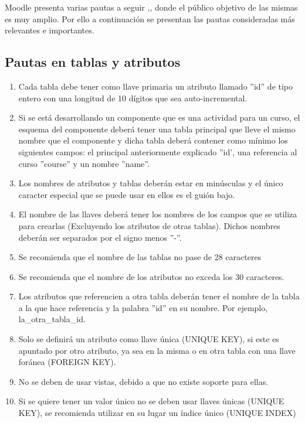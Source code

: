     \noindent Moodle presenta varias pautas a seguir \cite{moodlePautasBD1},\cite{ moodlePautasBD2}, donde el público objetivo de las mismas es muy amplio. Por ello a continuación se presentan las pautas consideradas más relevantes e importantes.
    
\subsection{Pautas en tablas y atributos}
    \begin{enumerate}
        \item Cada tabla debe tener como llave primaria un atributo llamado ''id'' de tipo entero con una longitud de 10 dígitos que sea auto-incremental. 
        \item Si se está desarrollando un componente que es una actividad para un curso, el esquema del componente deberá tener una tabla principal que lleve el mismo nombre que el componente y dicha tabla deberá contener como mínimo los siguientes campos: el principal anteriormente explicado ''id', una referencia al curso ''course'' y un nombre ''name''. 
        \item Los nombres de atributos y tablas deberán estar en minúsculas y el único caracter especial que se puede usar en ellos es el guión bajo.
        \item El nombre de las llaves deberá tener los nombres de los campos que se utiliza para crearlas (Excluyendo los atributos de otras tablas). Dichos nombres deberán ser separados por el signo menos ''-''.
        \item Se recomienda que el nombre de las tablas no pase de 28 caracteres
        \item Se recomienda que el nombre de los atributos no exceda los 30 caracteres.
        \item Los atributos que referencien a otra tabla deberán tener el nombre de la tabla a la que hace referencia y la palabra ''id'' en su nombre. Por ejemplo, la\_otra\_tabla\_id.
        \item Solo se definirá un atributo como llave única (UNIQUE KEY), si este es apuntado por otro atributo, ya sea en la misma o en otra tabla con una llave foránea (FOREIGN KEY).
        \item No se deben de usar vistas, debido a que no existe soporte para ellas.
        \item Si se quiere tener un valor único no se deben usar llaves únicas (UNIQUE KEY), se recomienda utilizar en su lugar un índice único (UNIQUE INDEX)
    \end{enumerate}
     
